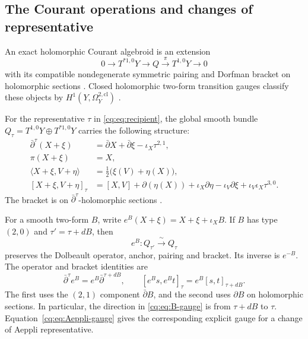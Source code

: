 \subsection{The Courant operations and changes of representative}

An exact holomorphic Courant algebroid is an extension
\[
 0\longrightarrow T^{*1,0}Y\longrightarrow Q
        \xrightarrow{\ \pi\ }T^{1,0}Y\longrightarrow0
\]
with its compatible nondegenerate symmetric pairing and Dorfman
bracket on holomorphic sections
\cite[Definitions~3.1--3.2]{GFJSCourant}.
Closed holomorphic two-form transition gauges classify these
objects by $H^1(Y,\Omega_Y^{2,\mathrm{cl}})$
\cite[Theorem~3.3]{GFJSCourant}.

For the representative $\tau$ in \eqref{cq:eq:recipient}, the
global smooth bundle
$Q_\tau=T^{1,0}Y\oplus T^{*1,0}Y$ carries the following structure:
\begin{equation}\label{cq:eq:operations}
 \begin{aligned}
 \bar\partial^\tau(X+\xi)
      &=\bar\partial X+\bar\partial\xi-\iota_X\tau^{2,1},\\
 \pi(X+\xi)&=X,\\
 \langle X+\xi,V+\eta\rangle
      &=\tfrac12\bigl(\xi(V)+\eta(X)\bigr),\\
 [X+\xi,V+\eta]_\tau
      &=[X,V]+\partial(\eta(X))+\iota_X\partial\eta
            -\iota_V\partial\xi+\iota_V\iota_X\tau^{3,0}.
 \end{aligned}
\end{equation}
The bracket is on $\bar\partial^\tau$-holomorphic sections
\cite[Definition~3.4]{GFJSCourant}.

For a smooth two-form $B$, write
$e^B(X+\xi)=X+\xi+\iota_XB$.
If $B$ has type $(2,0)$ and $\tau'=\tau+dB$, then
\begin{equation}\label{cq:eq:B-gauge}
                         e^B:Q_{\tau'}\xrightarrow{\ \sim\ }Q_\tau
\end{equation}
preserves the Dolbeault operator, anchor, pairing and bracket.
Its inverse is $e^{-B}$.
The operator and bracket identities are
\[
 \bar\partial^\tau e^B=e^B\bar\partial^{\tau+dB},\qquad
 [e^Bs,e^Bt]_\tau=e^B[s,t]_{\tau+dB}.
\]
The first uses the $(2,1)$ component $\bar\partial B$,
and the second uses $\partial B$ on holomorphic sections.
In particular, the direction in \eqref{cq:eq:B-gauge} is from
$\tau+dB$ to $\tau$.
Equation~\eqref{cq:eq:Aeppli-gauge} gives the corresponding
explicit gauge for a change of Aeppli representative.

